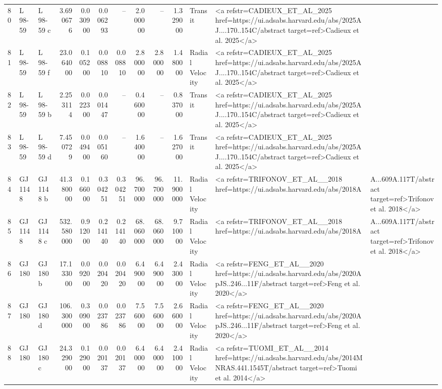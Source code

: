 \begin{tabular}{lllrrrrrrrll}
80 & L 98-59 & L 98-59 c & 3.690676 & 0.030900 & 0.006293 & -- & 2.000000 & -- & 1.329000 & Transit & <a refstr=CADIEUX_ET_AL_2025 href=https://ui.adsabs.harvard.edu/abs/2025AJ....170..154C/abstract target=ref>Cadieux et al. 2025</a> \\
81 & L 98-59 & L 98-59 f & 23.064000 & 0.105200 & 0.008810 & 0.008810 & 2.800000 & 2.800000 & 1.480000 & Radial Velocity & <a refstr=CADIEUX_ET_AL_2025 href=https://ui.adsabs.harvard.edu/abs/2025AJ....170..154C/abstract target=ref>Cadieux et al. 2025</a> \\
82 & L 98-59 & L 98-59 b & 2.253114 & 0.022300 & 0.001447 & -- & 0.460000 & -- & 0.837000 & Transit & <a refstr=CADIEUX_ET_AL_2025 href=https://ui.adsabs.harvard.edu/abs/2025AJ....170..154C/abstract target=ref>Cadieux et al. 2025</a> \\
83 & L 98-59 & L 98-59 d & 7.450729 & 0.049400 & 0.005160 & -- & 1.640000 & -- & 1.627000 & Transit & <a refstr=CADIEUX_ET_AL_2025 href=https://ui.adsabs.harvard.edu/abs/2025AJ....170..154C/abstract target=ref>Cadieux et al. 2025</a> \\
84 & GJ 1148 & GJ 1148 b & 41.380000 & 0.166000 & 0.304251 & 0.304251 & 96.700000 & 96.700000 & 11.900000 & Radial Velocity & <a refstr=TRIFONOV_ET_AL__2018 href=https://ui.adsabs.harvard.edu/abs/2018A&A...609A.117T/abstract target=ref>Trifonov et al. 2018</a> \\
85 & GJ 1148 & GJ 1148 c & 532.580000 & 0.912000 & 0.214140 & 0.214140 & 68.060000 & 68.060000 & 9.710000 & Radial Velocity & <a refstr=TRIFONOV_ET_AL__2018 href=https://ui.adsabs.harvard.edu/abs/2018A&A...609A.117T/abstract target=ref>Trifonov et al. 2018</a> \\
86 & GJ 180 & GJ 180 b & 17.133000 & 0.092000 & 0.020420 & 0.020420 & 6.490000 & 6.490000 & 2.430000 & Radial Velocity & <a refstr=FENG_ET_AL__2020 href=https://ui.adsabs.harvard.edu/abs/2020ApJS..246...11F/abstract target=ref>Feng et al. 2020</a> \\
87 & GJ 180 & GJ 180 d & 106.300000 & 0.309000 & 0.023786 & 0.023786 & 7.560000 & 7.560000 & 2.660000 & Radial Velocity & <a refstr=FENG_ET_AL__2020 href=https://ui.adsabs.harvard.edu/abs/2020ApJS..246...11F/abstract target=ref>Feng et al. 2020</a> \\
88 & GJ 180 & GJ 180 c & 24.329000 & 0.129000 & 0.020137 & 0.020137 & 6.400000 & 6.400000 & 2.410000 & Radial Velocity & <a refstr=TUOMI_ET_AL__2014 href=https://ui.adsabs.harvard.edu/abs/2014MNRAS.441.1545T/abstract target=ref>Tuomi et al. 2014</a> \\

\end{tabular}
